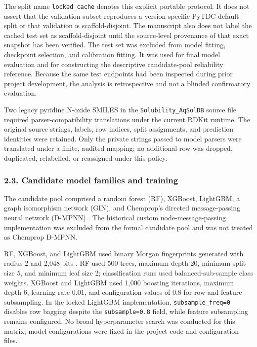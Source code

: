 \documentclass[
]{article}
\begin{document}
The split name \texttt{locked\_cache} denotes this explicit portable
protocol. It does not assert that the validation subset reproduces a
version-specific PyTDC default split or that validation is
scaffold-disjoint. The manuscript also does not label the cached test
set as scaffold-disjoint until the source-level provenance of that exact
snapshot has been verified. The test set was excluded from model
fitting, checkpoint selection, and calibration fitting. It was used for
final model evaluation and for constructing the descriptive
candidate-pool reliability reference. Because the same test endpoints
had been inspected during prior project development, the analysis is
retrospective and not a blinded confirmatory evaluation.

Two legacy pyridine N-oxide SMILES in the \texttt{Solubility\_AqSolDB}
source file required parser-compatibility translations under the current
RDKit runtime. The original source strings, labels, row indices, split
assignments, and prediction identities were retained. Only the private
strings passed to model parsers were translated under a finite, audited
mapping; no additional row was dropped, duplicated, relabelled, or
reassigned under this policy.

\subsubsection{2.3. Candidate model families and
training}\label{candidate-model-families-and-training}

The candidate pool comprised a random forest (RF), XGBoost, LightGBM, a
graph isomorphism network (GIN), and Chemprop's directed message-passing
neural network (D-MPNN) \cite{rogers2010ecfp,xu2019gnn,yang2019molecular,breiman2001rf,chen2016xgboost,ke2017lightgbm}.
The historical custom node-message-passing implementation was excluded
from the formal candidate pool and was not treated as Chemprop D-MPNN.

RF, XGBoost, and LightGBM used binary Morgan fingerprints generated with
radius 2 and 2,048 bits \cite{rogers2010ecfp}. RF used 500 trees, maximum depth 20,
minimum split size 5, and minimum leaf size 2; classification runs used
balanced-sub-sample class weights. XGBoost and LightGBM used 1,000
boosting iterations, maximum depth 6, learning rate 0.01, and
configuration values of 0.8 for row and feature subsampling. In the
locked LightGBM implementation, \texttt{subsample\_freq=0} disables row
bagging despite the \texttt{subsample=0.8} field, while feature
subsampling remains configured. No broad hyperparameter search
was conducted for this matrix; model configurations were fixed in the
project code and configuration files.
\end{document}
